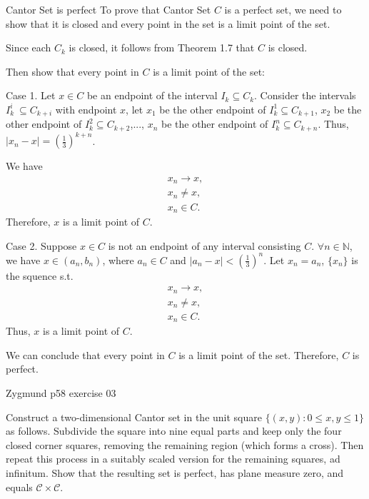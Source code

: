\documentclass[UTF8,a4paper,10pt]{article}
\begin{document}
  \begin{mybox}{Cantor Set is perfect}
    To prove that Cantor Set \(C\) is a perfect set, we need to show that it is closed and every point in the set is a limit point of the set.

    Since each \(C_k\) is closed, it follows from Theorem 1.7 that \(C\) is closed. 

    Then show that every point in \(C\) is a limit point of the set:

    Case 1. Let \(x\in C\) be an endpoint of the interval \(I_k\subseteq C_k\). Consider the intervals \(I_k^i\ \subseteq C_{k+i}\) with endpoint \(x\), let \(x_1\) be the other endpoint of \(I_k^1\subseteq C_{k+1}\), \(x_2\) be the other endpoint of \(I_k^2\subseteq C_{k+2}\),..., \(x_n\) be the other endpoint of \(I_k^n \subseteq C_{k+n}\). 
    Thus, \(|x_n-x|=(\frac{1}{3})^{k+n}\).

    We have 
    \begin{equation*}
      \begin{aligned}
        x_n\to x,\\
        x_n \neq x,\\
        x_n \in C.
      \end{aligned}
    \end{equation*}
    Therefore, \(x\) is a limit point of \(C\).

    Case 2. Suppose \(x\in C\) is not an endpoint of any interval consisting \(C\). \(\forall n\in\mathbb{N}\), we have \(x\in (a_n, b_n)\), where \(a_n\in C\) and \(|a_n-x|<(\frac{1}{3})^{n}\). Let \(x_n = a_n\), \(\{x_n\}\) is the squence s.t. 
    \begin{equation*}
      \begin{aligned}
        x_n\to x,\\
        x_n \neq x,\\
        x_n \in C.
      \end{aligned}
    \end{equation*}
    Thus, \(x\) is a limit point of \(C\).

    We can conclude that every point in \(C\) is a limit point of the set. Therefore, \(C\) is perfect.

    
  \end{mybox}





  \begin{Problem}[]{Zygmund p58 exercise 03}

    Construct a two-dimensional Cantor set in the unit square $\{(x, y) : 0 \leq x, y \leq 1\}$ as follows. Subdivide the square into nine equal parts and keep only the four closed corner squares, removing the remaining region (which forms a cross). Then repeat this process in a suitably scaled version for the remaining squares, ad infinitum. Show that the resulting set is perfect, has plane measure zero, and equals $\mathcal{C} \times \mathcal{C}$.
  
  \end{Problem}
\end{document}
